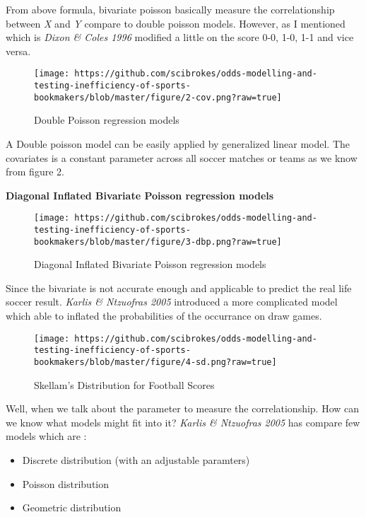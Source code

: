 \documentclass[article]{jss}
\providecommand{\tightlist}{%
  \setlength{\itemsep}{0pt}\setlength{\parskip}{0pt}}
\begin{document}
From above formula, bivariate poisson basically measure the
correlationship between \emph{X} and \emph{Y} compare to double poisson
models. However, as I mentioned which is \emph{Dixon \& Coles 1996}
modified a little on the score 0-0, 1-0, 1-1 and vice versa. \bigbreak

\begin{figure}[htbp]
\centering
\texttt{[image: https://github.com/scibrokes/odds-modelling-and-testing-inefficiency-of-sports-bookmakers/blob/master/figure/2-cov.png?raw=true]}
\caption{Double Poisson regression models}
\end{figure}

A Double poisson model can be easily applied by generalized linear
model. The covariates is a constant parameter across all soccer matches
or teams as we know from figure 2. \bigbreak

\textbf{Diagonal Inflated Bivariate Poisson regression models}

\begin{figure}[htbp]
\centering
\texttt{[image: https://github.com/scibrokes/odds-modelling-and-testing-inefficiency-of-sports-bookmakers/blob/master/figure/3-dbp.png?raw=true]}
\caption{Diagonal Inflated Bivariate Poisson regression models}
\end{figure}

Since the bivariate is not accurate enough and applicable to predict the
real life soccer result. \emph{Karlis \& Ntzuofras 2005} introduced a
more complicated model which able to inflated the probabilities of the
occurrance on draw games.

\begin{figure}[htbp]
\centering
\texttt{[image: https://github.com/scibrokes/odds-modelling-and-testing-inefficiency-of-sports-bookmakers/blob/master/figure/4-sd.png?raw=true]}
\caption{Skellam's Distribution for Football Scores}
\end{figure}

Well, when we talk about the parameter to measure the correlationship.
How can we know what models might fit into it? \emph{Karlis \& Ntzuofras
2005} has compare few models which are :

\begin{itemize}
\tightlist
\item
  Discrete distribution (with an adjustable paramters)
\item
  Poisson distribution
\item
  Geometric distribution
\end{itemize}
\end{document}
